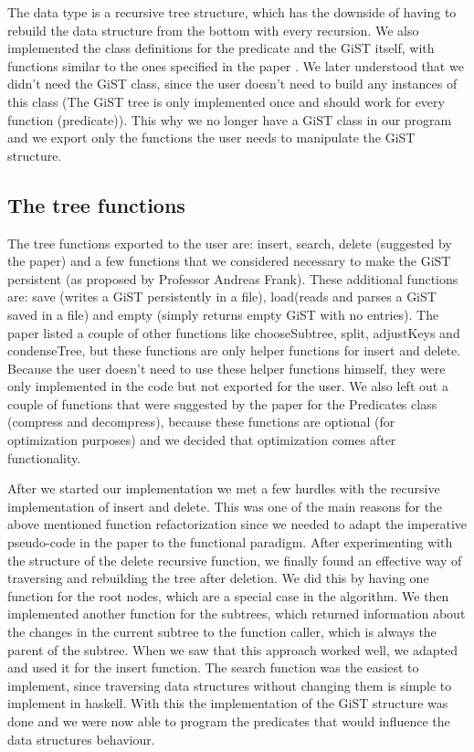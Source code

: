 \documentclass{scrartcl}
\begin{document}
 The data type is a recursive tree structure, which has the downside of having to rebuild the data structure from the bottom with every recursion.
 We also implemented the class definitions for the predicate and the GiST itself, with functions similar to the ones specified in the paper \cite{Hellerstein95generalizedsearch}. 
 We later understood that we didn't need the GiST class, since the user doesn't need to build any instances of this class (The GiST tree is only implemented once and should work
 for every function (predicate)). This why we no longer have a GiST class in our program and we export only the functions the user needs to manipulate the GiST structure.
\subsection{The tree functions}
The tree functions exported to the user are: insert, search, delete (suggested by the paper) and a few functions that we considered necessary to make the GiST persistent (as proposed by Professor Andreas Frank).
These additional functions are: save (writes a GiST persistently in a file), load(reads and parses a GiST saved in a file) and empty (simply returns empty GiST with no entries).
The paper \cite{Hellerstein95generalizedsearch} listed a couple of other functions like chooseSubtree, split, adjustKeys and condenseTree, but these functions are only helper functions for insert and delete.
Because the user doesn't need to use these helper functions himself, they were only implemented in the code but not exported for the user.
We also left out a couple of functions that were suggested by the paper for the Predicates class (compress and decompress), because these functions are optional (for optimization purposes) and
we decided that optimization comes after functionality.


After we started our implementation we met a few hurdles with the recursive implementation of insert and delete. This was one of the main reasons for the above mentioned function refactorization since we needed
to adapt the imperative pseudo-code in the paper \cite{Hellerstein95generalizedsearch} to the functional paradigm.
After experimenting with the structure of the delete recursive function, we finally found an effective way of traversing and rebuilding the tree after deletion. We did this
by having one function for the root nodes, which are a special case in the algorithm.
We then implemented another function for the subtrees, which returned information about the changes in the current subtree to the function caller, which is always the parent
of the subtree. When we saw that this approach worked well, we adapted and used it for the insert function. The search function was the easiest to implement, since traversing data structures without changing 
them is simple to implement in haskell. With this the implementation of the GiST structure was done and we were now able to program the predicates that would influence the data structures behaviour.
\end{document}
